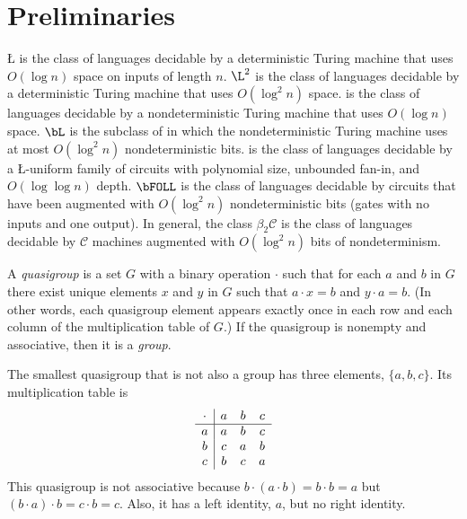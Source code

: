 \documentclass{article}
\begin{document}
\section{Preliminaries}

\L{} is the class of languages decidable by a deterministic Turing machine that uses $O(\log n)$ space on inputs of length $n$.
$\L^2$ is the class of languages decidable by a deterministic Turing machine that uses $O(\log^2 n)$ space.
\NL{} is the class of languages decidable by a nondeterministic Turing machine that uses $O(\log n)$ space.
$\bL$ is the subclass of \NL{} in which the nondeterministic Turing machine uses at most $O(\log^2 n)$ nondeterministic bits.
\FOLL{} is the class of languages decidable by a \L-uniform family of circuits with polynomial size, unbounded fan-in, and $O(\log \log n)$ depth.
$\bFOLL$ is the class of languages decidable by \FOLL{} circuits that have been augmented with $O(\log^2 n)$ nondeterministic bits (gates with no inputs and one output).
In general, the class $\beta_2 \mathcal{C}$ is the class of languages decidable by $\mathcal{C}$ machines augmented with $O(\log^2 n)$ bits of nondeterminism.

A \emph{quasigroup} is a set $G$ with a binary operation $\cdot$ such that for each $a$ and $b$ in $G$ there exist unique elements $x$ and $y$ in $G$ such that $a \cdot x = b$ and $y \cdot a = b$.
(In other words, each quasigroup element appears exactly once in each row and each column of the multiplication table of $G$.)
If the quasigroup is nonempty and associative, then it is a \emph{group}.

\begin{example}\label{ex:quasigroup}
  The smallest quasigroup that is not also a group has three elements, $\{a, b, c\}$.
  Its multiplication table is
  \begin{equation*}
    \begin{array}{c | c c c}
      \cdot & a & b & c \\
      \hline
      a & a & b & c \\
      b & c & a & b \\
      c & b & c & a \\
    \end{array}
  \end{equation*}
  This quasigroup is not associative because $b \cdot (a \cdot b) = b \cdot b = a$ but $(b \cdot a) \cdot b = c \cdot b = c$.
  Also, it has a left identity, $a$, but no right identity.
\end{example}
\end{document}
